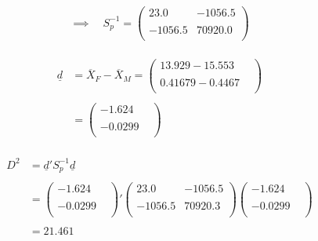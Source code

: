 \documentclass[11pt,a4paper]{article}
\theoremstyle{definition}
\begin{document}
$$\implies\quad  S^{-1}_p=
\begin{pmatrix}
23.0 & -1056.5\\
&\\
-1056.5 & 70920.0\\
\end{pmatrix}
$$\\


\begin{align*}
\underline{d} & = \overline{X}_F - \overline{X}_M
 = \begin{pmatrix}
13.929 - 15.553\\
&\\
0.41679 - 0.4467\\
\end{pmatrix}\\\\
& = 
\begin{pmatrix}
-1.624\\
&\\
-0.0299\\
\end{pmatrix}\\
\end{align*}






\begin{align*}
D^2 & = \underline{d}'S^{-1}_p \underline{d}\\\\
& = \begin{pmatrix}
-1.624\\\
&\\
-0.0299\\
\end{pmatrix}'
\begin{pmatrix}
23.0 & -1056.5\\
&\\
-1056.5 & 70920.3\\
\end{pmatrix}
\begin{pmatrix}
-1.624\\\
&\\
-0.0299\\
\end{pmatrix}\\\\
& = 21.461\\\\\
\end{align*}
\end{document}
